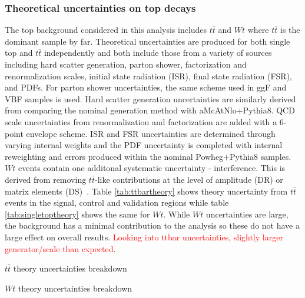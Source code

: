 \subsubsection{Theoretical uncertainties on top decays}
The top background considered in this analysis includes $t\bar{t}$ and $Wt$ where $t\bar{t}$ is the dominant sample by far. Theoretical uncertainties are produced for both single top and $t\bar{t}$ independently and both include those from a variety of sources including hard scatter generation, parton shower, factorization and renormalization scales, initial state radiation (ISR), final state radiation (FSR), and PDFs. For parton shower uncertainties, the same scheme used in ggF and VBF samples is used. Hard scatter generation uncertainties are similarly derived from comparing the nominal generation method with aMcAtNlo$+$Pythia8. QCD scale uncertainties from renormalization and factorization are added with a 6-point envelope scheme. ISR and FSR uncertainties are determined through varying internal weights and the PDF uncertainty is completed with internal reweighting and errors produced within the nominal Powheg$+$Pythia8 samples. $Wt$ events contain one additonal systematic uncertainty - interference. This is derived from removing $t\bar{t}$-like contributions at the level of amplitude (DR) or matrix elements (DS)~\cite{Wttheory}. Table \ref{tab:ttbartheory} shows theory uncertainty from $t\bar{t}$ events in the signal, control and validation regions while table \ref{tab:singletoptheory} shows the same for $Wt$. While $Wt$ uncertainties are large, the background has a minimal contribution to the analysis so these do not have a large effect on overall results. \textcolor{red}{Looking into ttbar uncertainties, slightly larger generator/scale than expected}. 

\begin{table}[h!]
\centering
\scalebox{1.0}{

}
\caption{$t\bar{t}$ theory uncertainties breakdown}
\label{tab:ttbartheory}
\end{table}

\begin{table}[h!]
\centering
\scalebox{1.0}{

}
\caption{$Wt$ theory uncertainties breakdown}
\label{tab:singletoptheory}
\end{table}

